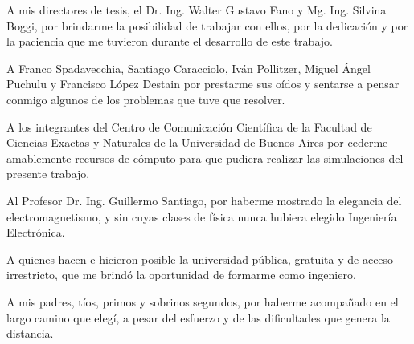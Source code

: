 A mis directores de tesis, el Dr. Ing. Walter Gustavo Fano y Mg. Ing. Silvina Boggi, por brindarme la posibilidad de trabajar con ellos, por la dedicación y por la paciencia que me tuvieron durante el desarrollo de este trabajo.

A Franco Spadavecchia, Santiago Caracciolo, Iván Pollitzer, Miguel Ángel Puchulu y Francisco López Destain por prestarme sus oídos y sentarse a pensar conmigo algunos de los problemas que tuve que resolver.

A los integrantes del Centro de Comunicación Científica de la Facultad de Ciencias Exactas y Naturales de la Universidad de Buenos Aires por cederme amablemente recursos de cómputo para que pudiera realizar las simulaciones del presente trabajo.

Al Profesor Dr. Ing. Guillermo Santiago, por haberme mostrado la elegancia del electromagnetismo, y sin cuyas clases de física nunca hubiera elegido Ingeniería Electrónica.

A quienes hacen e hicieron posible la universidad pública, gratuita y de acceso irrestricto, que me brindó la oportunidad de formarme como ingeniero.

A mis padres, tíos, primos y sobrinos segundos, por haberme acompañado en el largo camino que elegí, a pesar del esfuerzo y de las dificultades que genera la distancia.